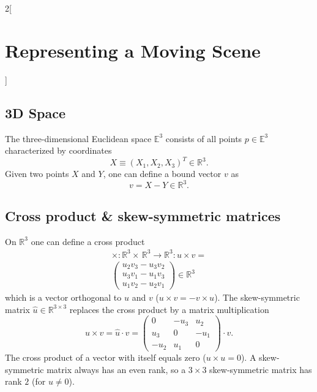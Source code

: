 \documentclass[oneside,fontsize=11pt,paper=a4]{scrartcl}
\begin{document}
\begin{multicols}{2}[\section{Representing a Moving Scene}]
\subsection{3D Space} \label{subsection:3d_space}
The three-dimensional Euclidean space $\mathbb{E}^3$ consists of all points $p \in \mathbb{E}^3$ characterized by coordinates
\begin{equation*}
    X \equiv (X_1, X_2, X_3)^T \in \mathbb{R}^3.
\end{equation*}
Given two points $X$ and $Y$, one can define a bound vector $v$ as
\begin{equation*}
    v = X - Y \in \mathbb{R}^3.
\end{equation*}

\subsection{Cross product \& skew-symmetric matrices} \label{subsection:cross_product_skew}
On $\mathbb{R}^3$ one can define a cross product
\begin{equation*}
\begin{split}
    \times : \mathbb{R}^3 \times \, \mathbb{R}^3 \rightarrow \mathbb{R}^3: u \times v = \\ \begin{pmatrix} u_2v_3 - u_3v_2\\ u_3v_1 - u_1v_3\\u_1v_2 - u_2v_1 \end{pmatrix} \in \mathbb{R}^3
\end{split}
\end{equation*}
which is a vector orthogonal to $u$ and $v$ ($u \times v = -v \times u$).
The skew-symmetric matrix $\hat{u} \in \mathbb{R}^{3 \times 3}$ replaces the cross product by a matrix multiplication
\begin{equation*}
     u \times v = \hat{u} \cdot v = \begin{pmatrix} 0 & -u_3 & u_2\\ u_3 & 0 & -u_1\\ -u_2 & u_1 & 0 \end{pmatrix} \cdot v.
\end{equation*}
The cross product of a vector with itself equals zero ($u \times u = 0$). A skew-symmetric matrix always has an even rank, so a $3 \times 3$ skew-symmetric matrix has rank $2$ (for $u \neq 0$).


\end{multicols}
\end{document}

